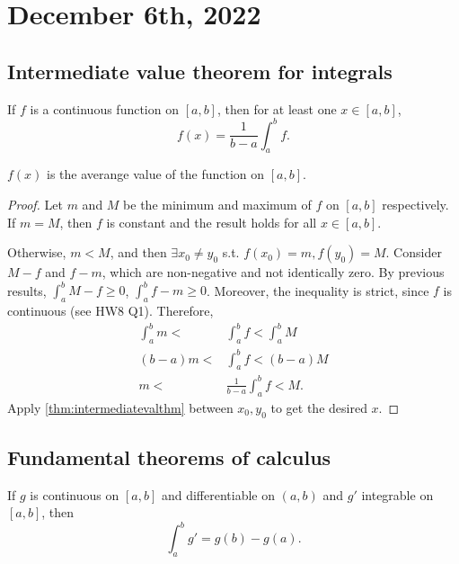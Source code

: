 \documentclass[11pt]{scrartcl}
\numberwithin{equation}{section}
\begin{document}
\section{December 6th, 2022}

\subsection{Intermediate value theorem for integrals}

\begin{theorem}
    If $f$ is a continuous function on $[a,b]$, then 
    for at least one $x\in[a,b]$,
    \[
        f(x) = \frac{1}{b-a}\int_a^bf.
    \]
\end{theorem}
$f(x)$ is the averange value of the function on $[a,b]$.

\begin{proof}
    Let $m$ and $M$ be the minimum and maximum of $f$ on $[a,b]$ respectively.
    If $m=M$, then $f$ is constant and the result holds for all $x\in[a,b]$.
    
    Otherwise, $m<M$, and then $\exists x_0\neq y_0$ s.t. 
    $f(x_0) = m, f(y_0) = M$. Consider $M-f$ and $f-m$, which are non-negative and not identically zero.
    By previous results, $\int_{a}^{b}M-f\geq 0$, $\int_{a}^{b}f-m\geq 0$.
    Moreover, the inequality is strict, since $f$ is continuous (see HW8 Q1).
    Therefore, 
    \begin{align*}
        \int_{a}^{b}m < &\int_{a}^{b}f < \int_{a}^{b}M \\
        (b-a)m < &\int_{a}^{b}f<(b-a)M\\
        m < &\frac{1}{b-a}\int_{a}^{b}f<M.
    \end{align*}
    Apply \cref{thm:intermediatevalthm} between $x_0, y_0$ to get 
    the desired $x$.
\end{proof}

\subsection{Fundamental theorems of calculus}

\begin{theorem}
    \label{thm:fundthmcalc}
    If $g$ is continuous on $[a,b]$ and differentiable on $(a,b)$
    and $g'$ integrable on $[a,b]$, then 
    \[
        \int_{a}^{b}g' = g(b)-g(a).
    \]
\end{theorem}
\end{document}
